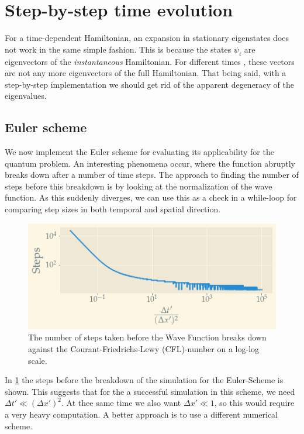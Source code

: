 \section{Step-by-step time evolution}

For a time-dependent Hamiltonian, an expansion in stationary eigenstates does not work in the same simple fashion. This is because the states $\psi_i$ are eigenvectors of the \textit{instantaneous} Hamiltonian. For different times , these vectors are not any more eigenvectors of the full Hamiltonian. 
That being said, with a step-by-step implementation we should get rid of the apparent degeneracy of the eigenvalues. 

\subsection{Euler scheme}
We now implement the Euler scheme for evaluating its applicability for the quantum problem. An interesting phenomena occur, where the function abruptly breaks down after a number of time steps. The approach to finding the number of steps before this breakdown is by looking at the normalization of the wave function. As this suddenly diverges, we can use this as a check in a while-loop for comparing step sizes in both temporal and spatial direction. 
\begin{figure}
	\centering
	\includegraphics[width=\linewidth]{img/cfl.png}
	\caption{The number of steps taken before the Wave Function breaks down against the Courant-Friedrichs-Lewy (CFL)-number on a log-log scale.}
	\label{fig:cfl}
\end{figure}

In \cref{fig:cfl} the steps before the breakdown of the simulation for the Euler-Scheme is shown. This suggests that for the a successful simulation in this scheme, we need $\Delta t' \ll (\Delta x')^2$. At thee same time we also want $\Delta x' \ll 1$, so this would require a very heavy computation. A better approach is to use a different numerical scheme. 

